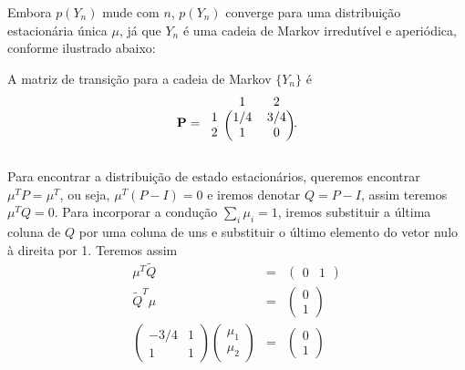 \begin{questions}
\begin{solution}
\begin{parts}
Embora $p(Y_n)$ mude com $n$, $p(Y_n)$ converge para uma distribuição estacionária
única $\mu$, já que $Y_n$ é uma cadeia de Markov irredutível e aperiódica, conforme 
ilustrado abaixo:

\begin{center}
\end{center}

A matriz de transição para a cadeia de Markov $\{Y_n\}$ é 
\begin{equation}
\mathbf{P} = 
\begin{blockarray}{ccc}
 & 1 & 2 \\
\begin{block}{c(cc)}
 1 & 1/4 & 3/4 \\
 2 & 1   & 0   \\
\end{block}
\end{blockarray} .
\end{equation}

Para encontrar a distribuição de estado estacionários,
queremos encontrar $\mu^T P = \mu^T$, ou seja, $\mu^T (P - I) = 0$
e iremos denotar $Q = P - I$, assim teremos $\mu^T Q = 0$.
Para incorporar a condução $\sum_i \mu_i = 1$, iremos substituir 
a última coluna de $Q$ por uma coluna de uns e substituir o último
elemento do vetor nulo à direita por 1. Teremos assim
\begin{eqnarray}
\mu^T \tilde{Q} &=& \begin{pmatrix} 0 & 1 \end{pmatrix} \\
\tilde{Q}^T \mu &=& \begin{pmatrix} 0 \\ 1 \end{pmatrix} \\
\begin{pmatrix} 
-3/4 & 1 \\
1 & 1
\end{pmatrix} 
\begin{pmatrix} \mu_1 \\ \mu_2 \end{pmatrix} 
&=& \begin{pmatrix} 0 \\ 1 \end{pmatrix}
\end{eqnarray}


\end{parts}
\end{solution}
\end{questions}
